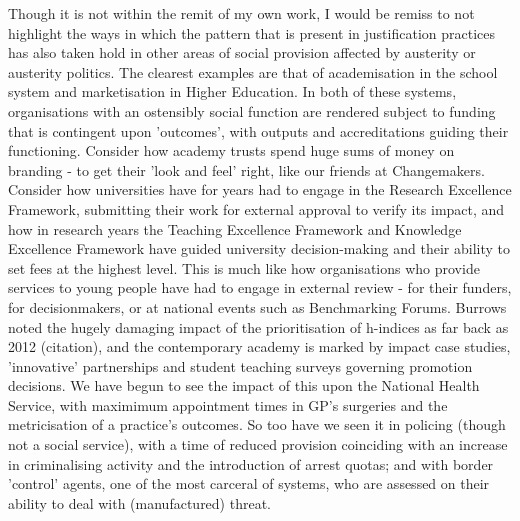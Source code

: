 Though it is not within the remit of my own work, I would be remiss to not highlight the ways in which the pattern that is present in justification practices has also taken hold in other areas of social provision affected by austerity or austerity politics. The clearest examples are that of academisation in the school system and marketisation in Higher Education. In both of these systems, organisations with an ostensibly social function are rendered subject to funding that is contingent upon 'outcomes', with outputs and accreditations guiding their functioning. Consider how academy trusts spend huge sums of money on branding - to get their 'look and feel' right, like our friends at Changemakers. Consider how universities have for years had to engage in the Research Excellence Framework, submitting their work for external approval to verify its impact, and how in research years the Teaching Excellence Framework and Knowledge Excellence Framework have guided university decision-making and their ability to set fees at the highest level. This is much like how organisations who provide services to young people have had to engage in external review - for their funders, for decisionmakers, or at national events such as Benchmarking Forums. Burrows noted the hugely damaging impact of the prioritisation of h-indices as far back as 2012 (citation), and the contemporary academy is marked by impact case studies, 'innovative' partnerships and student teaching surveys governing promotion decisions. We have begun to see the impact of this upon the National Health Service, with maximimum appointment times in GP's surgeries and the metricisation of a practice's outcomes. So too have we seen it in policing (though not a social service), with a time of reduced provision coinciding with an increase in criminalising activity and the introduction of arrest quotas; and with border 'control' agents, one of the most carceral of systems, who are assessed on their ability to deal with (manufactured) threat.


